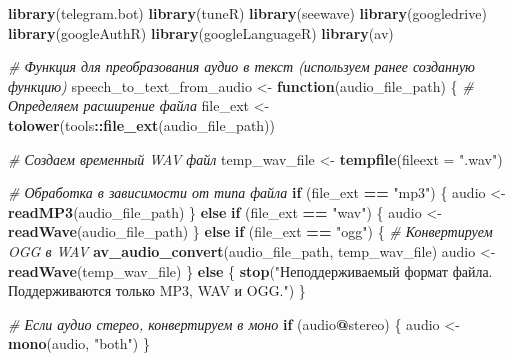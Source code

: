 \documentclass[
]{book}
\newenvironment{Shaded}{\begin{snugshade}}{\end{snugshade}}
\newcommand{\AttributeTok}[1]{\textcolor[rgb]{0.13,0.29,0.53}{#1}}
\newcommand{\CommentTok}[1]{\textcolor[rgb]{0.56,0.35,0.01}{\textit{#1}}}
\newcommand{\ControlFlowTok}[1]{\textcolor[rgb]{0.13,0.29,0.53}{\textbf{#1}}}
\newcommand{\FunctionTok}[1]{\textcolor[rgb]{0.13,0.29,0.53}{\textbf{#1}}}
\newcommand{\NormalTok}[1]{#1}
\newcommand{\OtherTok}[1]{\textcolor[rgb]{0.56,0.35,0.01}{#1}}
\newcommand{\SpecialCharTok}[1]{\textcolor[rgb]{0.81,0.36,0.00}{\textbf{#1}}}
\newcommand{\StringTok}[1]{\textcolor[rgb]{0.31,0.60,0.02}{#1}}
\begin{document}
\begin{Shaded}
\begin{Highlighting}[]
\FunctionTok{library}\NormalTok{(telegram.bot)}
\FunctionTok{library}\NormalTok{(tuneR)}
\FunctionTok{library}\NormalTok{(seewave)}
\FunctionTok{library}\NormalTok{(googledrive)}
\FunctionTok{library}\NormalTok{(googleAuthR)}
\FunctionTok{library}\NormalTok{(googleLanguageR)}
\FunctionTok{library}\NormalTok{(av)}

\CommentTok{\# Функция для преобразования аудио в текст (используем ранее созданную функцию)}
\NormalTok{speech\_to\_text\_from\_audio }\OtherTok{\textless{}{-}} \ControlFlowTok{function}\NormalTok{(audio\_file\_path) \{}
  \CommentTok{\# Определяем расширение файла}
\NormalTok{  file\_ext }\OtherTok{\textless{}{-}} \FunctionTok{tolower}\NormalTok{(tools}\SpecialCharTok{::}\FunctionTok{file\_ext}\NormalTok{(audio\_file\_path))}
  
  \CommentTok{\# Создаем временный WAV файл}
\NormalTok{  temp\_wav\_file }\OtherTok{\textless{}{-}} \FunctionTok{tempfile}\NormalTok{(}\AttributeTok{fileext =} \StringTok{".wav"}\NormalTok{)}
  
  \CommentTok{\# Обработка в зависимости от типа файла}
  \ControlFlowTok{if}\NormalTok{ (file\_ext }\SpecialCharTok{==} \StringTok{"mp3"}\NormalTok{) \{}
\NormalTok{    audio }\OtherTok{\textless{}{-}} \FunctionTok{readMP3}\NormalTok{(audio\_file\_path)}
\NormalTok{  \} }\ControlFlowTok{else} \ControlFlowTok{if}\NormalTok{ (file\_ext }\SpecialCharTok{==} \StringTok{"wav"}\NormalTok{) \{}
\NormalTok{    audio }\OtherTok{\textless{}{-}} \FunctionTok{readWave}\NormalTok{(audio\_file\_path)}
\NormalTok{  \} }\ControlFlowTok{else} \ControlFlowTok{if}\NormalTok{ (file\_ext }\SpecialCharTok{==} \StringTok{"ogg"}\NormalTok{) \{}
    \CommentTok{\# Конвертируем OGG в WAV}
    \FunctionTok{av\_audio\_convert}\NormalTok{(audio\_file\_path, temp\_wav\_file)}
\NormalTok{    audio }\OtherTok{\textless{}{-}} \FunctionTok{readWave}\NormalTok{(temp\_wav\_file)}
\NormalTok{  \} }\ControlFlowTok{else}\NormalTok{ \{}
    \FunctionTok{stop}\NormalTok{(}\StringTok{"Неподдерживаемый формат файла. Поддерживаются только MP3, WAV и OGG."}\NormalTok{)}
\NormalTok{  \}}
  
  \CommentTok{\# Если аудио стерео, конвертируем в моно}
  \ControlFlowTok{if}\NormalTok{ (audio}\SpecialCharTok{@}\NormalTok{stereo) \{}
\NormalTok{    audio }\OtherTok{\textless{}{-}} \FunctionTok{mono}\NormalTok{(audio, }\StringTok{"both"}\NormalTok{)}
\NormalTok{  \}}
  

\end{Highlighting}
\end{Shaded}
\end{document}
